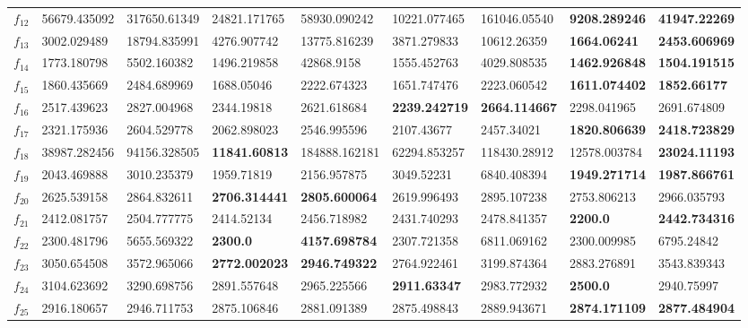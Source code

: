 \begin{table*}[t!]
\begin{tabular}{|p{0.8cm}|p{1.6cm}|p{1.6cm}|p{1.6cm}|p{1.6cm}|p{1.6cm}|p{1.6cm}|p{1.6cm}|p{1.6cm}|}
$f_{12}$  & 56679.435092 & 317650.61349 & 24821.171765 & 58930.090242 & 10221.077465 & 161046.05540 & \textbf{9208.289246} & \textbf{41947.22269} \\ 
$f_{13}$  & 3002.029489 & 18794.835991 & 4276.907742 & 13775.816239 & 3871.279833 & 10612.26359 & \textbf{1664.06241} & \textbf{2453.606969} \\ 
$f_{14}$  & 1773.180798 & 5502.160382 & 1496.219858 & 42868.9158 & 1555.452763 & 4029.808535 & \textbf{1462.926848} & \textbf{1504.191515} \\ 
$f_{15}$  & 1860.435669 & 2484.689969 & 1688.05046 & 2222.674323 & 1651.747476 & 2223.060542 & \textbf{1611.074402} & \textbf{1852.66177} \\ 
$f_{16}$  & 2517.439623 & 2827.004968 & 2344.19818 & 2621.618684 & \textbf{2239.242719} & \textbf{2664.114667} & 2298.041965 & 2691.674809 \\ 
$f_{17}$  & 2321.175936 & 2604.529778 & 2062.898023 & 2546.995596 & 2107.43677 & 2457.34021 & \textbf{1820.806639} & \textbf{2418.723829} \\ 
$f_{18}$  & 38987.282456 & 94156.328505 & \textbf{11841.60813} & 184888.162181 & 62294.853257 & 118430.28912 & 12578.003784 & \textbf{23024.11193} \\ 
$f_{19}$  & 2043.469888 & 3010.235379 & 1959.71819 & 2156.957875 & 3049.52231 & 6840.408394 & \textbf{1949.271714} & \textbf{1987.866761} \\ 
$f_{20}$  & 2625.539158 & 2864.832611 & \textbf{2706.314441} & \textbf{2805.600064} & 2619.996493 & 2895.107238 & 2753.806213 & 2966.035793 \\ 
$f_{21}$  & 2412.081757 & 2504.777775 & 2414.52134 & 2456.718982 & 2431.740293 & 2478.841357 & \textbf{2200.0} & \textbf{2442.734316} \\ 
$f_{22}$  & 2300.481796 & 5655.569322 & \textbf{2300.0} & \textbf{4157.698784} & 2307.721358 & 6811.069162 & 2300.009985 & 6795.24842 \\ 
$f_{23}$  & 3050.654508 & 3572.965066 & \textbf{2772.002023} & \textbf{2946.749322} & 2764.922461 & 3199.874364 & 2883.276891 & 3543.839343 \\ 
$f_{24}$  & 3104.623692 & 3290.698756 & 2891.557648 & 2965.225566 & \textbf{2911.63347} & 2983.772932 & \textbf{2500.0} & 2940.75997 \\ 
$f_{25}$  & 2916.180657 & 2946.711753 & 2875.106846 & 2881.091389 & 2875.498843 & 2889.943671 & \textbf{2874.171109} & \textbf{2877.484904} \\ 

\end{tabular}
\end{table*}
